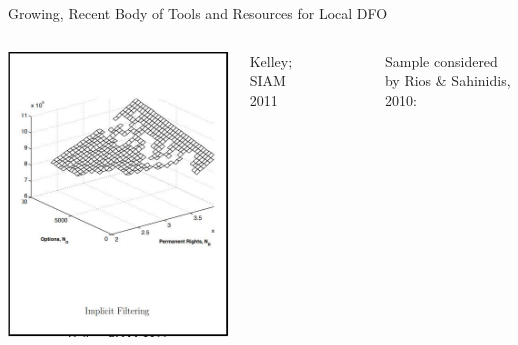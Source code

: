 \documentclass[handout,aspectratio=54]{beamer}
\numberwithin{theorem}{section}
\begin{document}
\begin{frame}{Growing, Recent Body of Tools and Resources for Local DFO}
\begin{columns}
\includegraphics[width=\textwidth]{fig/35-2.jpg}

\begin{center}\scriptsize
Kelley; SIAM 2011
\end{center}

\small
\colorbox[rgb]{0.5,0.6,0.7}{\textcolor{white}{Many solvers}}

\tiny

Sample considered by Rios \& Sahinidis, 2010:


\end{columns}
\end{frame}
\end{document}
